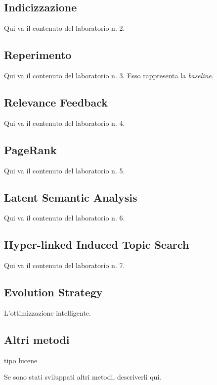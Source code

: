 \subsection{Indicizzazione} \label{sec:metodi-di-indic}

Qui va il contenuto del laboratorio n. 2.

\subsection{Reperimento}
\label{sec:metodi-di-reper}

Qui va il contenuto del laboratorio n. 3. Esso rappresenta la \textit{baseline}.

\subsection{Relevance Feedback}
\label{sec:relevance-feedback}

Qui va il contenuto del laboratorio n. 4.

\subsection{PageRank}
\label{sec:pagerank}

Qui va il contenuto del laboratorio n. 5.

\subsection{Latent Semantic Analysis}
\label{sec:lsa}

Qui va il contenuto del laboratorio n. 6.

\subsection{Hyper-linked Induced Topic Search}
\label{sec:hits}

Qui va il contenuto del laboratorio n. 7.

\subsection{Evolution Strategy}
\label{sec:es}

L'ottimizzazione intelligente.

\subsection{Altri metodi}
tipo lucene
\label{sec:altri-metodi}

Se sono stati sviluppati altri metodi, descriverli qui.

